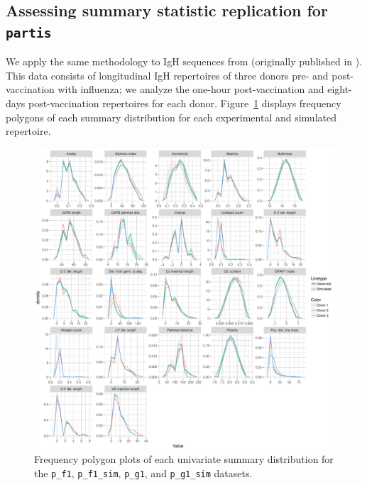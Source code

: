 \documentclass{article}
\begin{document}
\subsection*{Assessing summary statistic replication for \texttt{partis}}
We apply the same methodology to IgH sequences from \cite{Gupta2017-ve} (originally published in \cite{Laserson2014-dx}).
This data consists of longitudinal IgH repertoires of three donors pre- and post-vaccination with influenza; we analyze the one-hour post-vaccination and eight-days post-vaccination repertoires for each donor.
Figure~\ref{fig:PartisFreqPolys} displays frequency polygons of each summary distribution for each experimental and simulated repertoire.
\begin{figure}
    \includegraphics[width=\linewidth]{Figures/PartisScores/partis_freqpoly.pdf}
    \caption{Frequency polygon plots of each univariate summary distribution for the \texttt{p\_f1}, \texttt{p\_f1\_sim}, \texttt{p\_g1}, and \texttt{p\_g1\_sim} datasets.}
    \label{fig:PartisFreqPolys}
\end{figure}
\end{document}
